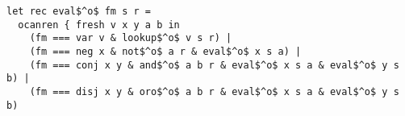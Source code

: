 \begin{lstlisting}
let rec eval$^o$ fm s r =
  ocanren { fresh v x y a b in
    (fm === var v & lookup$^o$ v s r) |
    (fm === neg x & not$^o$ a r & eval$^o$ x s a) |
    (fm === conj x y & and$^o$ a b r & eval$^o$ x s a & eval$^o$ y s b) |
    (fm === disj x y & oro$^o$ a b r & eval$^o$ x s a & eval$^o$ y s b)
  \end{lstlisting}
